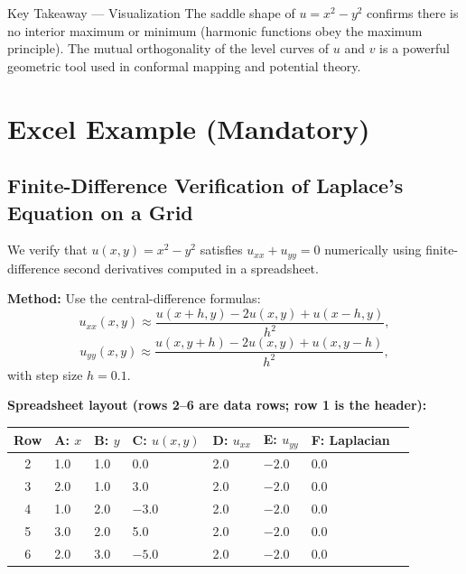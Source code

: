 \documentclass[12pt,a4paper]{article}
\begin{document}
\begin{learnbox}{Key Takeaway --- Visualization}
The saddle shape of $u=x^{2}-y^{2}$ confirms there is no interior maximum or minimum (harmonic
functions obey the maximum principle). The mutual orthogonality of the level curves of $u$ and
$v$ is a powerful geometric tool used in conformal mapping and potential theory.
\end{learnbox}

\section{Excel Example (Mandatory)}

\subsection*{Finite-Difference Verification of Laplace's Equation on a Grid}

We verify that $u(x,y)=x^{2}-y^{2}$ satisfies $u_{xx}+u_{yy}=0$ numerically using
finite-difference second derivatives computed in a spreadsheet.

\medskip

\textbf{Method:} Use the central-difference formulas:
\[
  u_{xx}(x,y) \approx \frac{u(x+h,y)-2u(x,y)+u(x-h,y)}{h^{2}},
\]
\[
  u_{yy}(x,y) \approx \frac{u(x,y+h)-2u(x,y)+u(x,y-h)}{h^{2}},
\]
with step size $h=0.1$.

\medskip

\textbf{Spreadsheet layout (rows 2--6 are data rows; row 1 is the header):}

\begin{center}
\begin{tabular}{@{}clllllll@{}}
\toprule
\textbf{Row} & \textbf{A: $x$} & \textbf{B: $y$} & \textbf{C: $u(x,y)$}
             & \textbf{D: $u_{xx}$} & \textbf{E: $u_{yy}$} & \textbf{F: Laplacian} \\
\midrule
2 & 1.0 & 1.0 & 0.0     & 2.0  & $-2.0$ & 0.0 \\
3 & 2.0 & 1.0 & 3.0     & 2.0  & $-2.0$ & 0.0 \\
4 & 1.0 & 2.0 & $-3.0$  & 2.0  & $-2.0$ & 0.0 \\
5 & 3.0 & 2.0 & 5.0     & 2.0  & $-2.0$ & 0.0 \\
6 & 2.0 & 3.0 & $-5.0$  & 2.0  & $-2.0$ & 0.0 \\
\bottomrule
\end{tabular}
\end{center}
\end{document}
